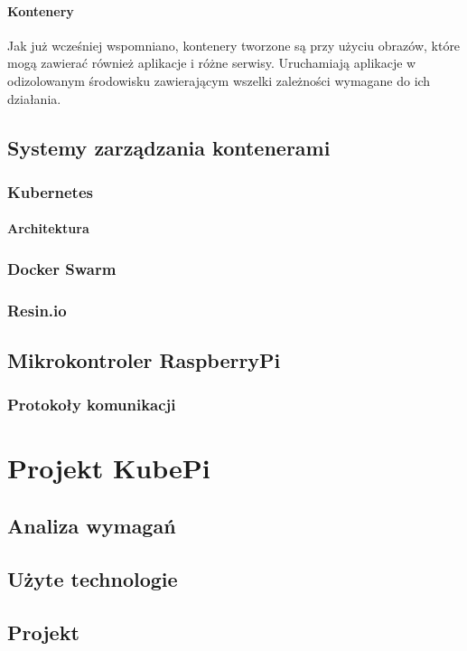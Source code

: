 \documentclass[12pt]{report}
\let\Oldsection\section
\renewcommand{\section}{\FloatBarrier\Oldsection}
\let\Oldsubsection\subsection
\renewcommand{\subsection}{\FloatBarrier\Oldsubsection}
\let\Oldsubsubsection\subsubsection
\renewcommand{\subsubsection}{\FloatBarrier\Oldsubsubsection}
\begin{document}
\subsubsection{Kontenery}
Jak już wcześniej wspomniano, kontenery tworzone są przy użyciu obrazów, które mogą zawierać również aplikacje i różne serwisy. Uruchamiają aplikacje w odizolowanym środowisku zawierającym wszelki zależności wymagane do ich działania. 

\section{Systemy zarządzania kontenerami}

\subsection{Kubernetes}
\subsubsection{Architektura}

\subsection{Docker Swarm}

\subsection{Resin.io}

\section{Mikrokontroler RaspberryPi}
\subsection{Protokoły komunikacji}

\chapter{Projekt KubePi} \label{rozdz.czesc.prakt}
\section{Analiza wymagań}
\section{Użyte technologie}
\section{Projekt}
\end{document}
